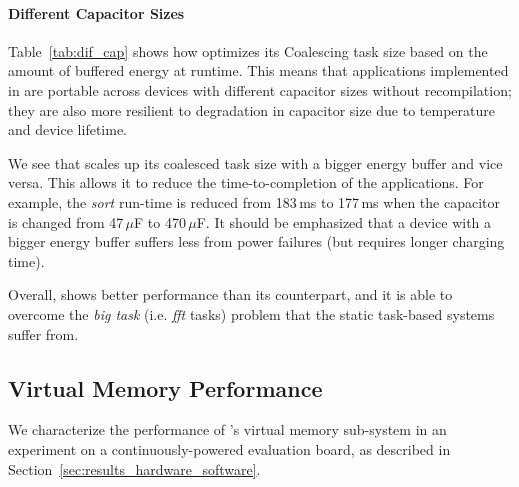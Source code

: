 \paragraph{Different Capacitor Sizes}
Table~\ref{tab:dif_cap} shows how \sys optimizes its Coalescing task size based on the amount of buffered energy at runtime. This means that applications implemented in \sys are portable across devices with different capacitor sizes without recompilation; they are also more resilient to degradation in capacitor size due to temperature and device lifetime. 

We see that \sys scales up its coalesced task size with a bigger energy buffer and vice versa. 
This allows it to reduce the time-to-completion of the applications. For example, 
the \textit{sort} run-time is reduced from 183\,ms to 177\,ms when the capacitor is changed from 47\,$\mu$F to 470\,$\mu$F. It should be emphasized that a device with a bigger energy buffer suffers less from power failures (but requires longer charging time). 

 
Overall, \sys shows better performance than its counterpart, and it is able to overcome the \textit{big task} (i.e. \textit{fft} tasks) problem that the static task-based systems suffer from. 

\subsection{Virtual Memory Performance}
\label{sec:results_memory_management}

We characterize the performance of \sys's virtual memory sub-system in an
experiment on a continuously-powered evaluation board, as described in
Section~\ref{sec:results_hardware_software}.

